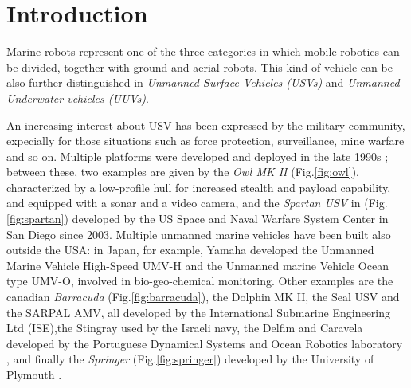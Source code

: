 \documentclass[12pt]{article}
\begin{document}
%



\section{Introduction} \label{introduction}

      Marine robots represent one of the three categories in which mobile robotics can be divided, together with ground and aerial robots. This kind of vehicle can be also further distinguished in \textit{Unmanned Surface Vehicles (USVs)} and \textit{Unmanned Underwater vehicles (UUVs)}.

      \indent An increasing interest about USV has been expressed by the military community, expecially for those situations such as force protection, surveillance, mine warfare and so on. Multiple platforms were developed and deployed in the late 1990s  \parencite{Bertram2008}; between these, two examples are given by the \textit{Owl MK II} (Fig.\ref{fig:owl}), characterized by a low-profile hull for increased stealth and payload capability, and equipped with a sonar and a video camera, and the \textit{Spartan USV} in (Fig.\ref{fig:spartan}) developed by the US Space and Naval Warfare System Center in San Diego since 2003. Multiple unmanned marine vehicles have been built also outside the USA: in Japan, for example, Yamaha developed the Unmanned Marine Vehicle High-Speed UMV-H and the Unmanned marine Vehicle Ocean type UMV-O, involved in bio-geo-chemical monitoring. Other examples are the canadian \textit{Barracuda} (Fig.\ref{fig:barracuda}), the Dolphin MK II, the Seal USV and the SARPAL AMV, all developed by the International Submarine Engineering Ltd (ISE),the Stingray used by the Israeli navy, the Delfim and Caravela developed by the Portuguese Dynamical Systems and Ocean Robotics laboratory \parencite{4124872}, and finally the \textit{Springer} (Fig.\ref{fig:springer}) developed by the University of Plymouth \parencite{Naeem2009} .
\end{document}
